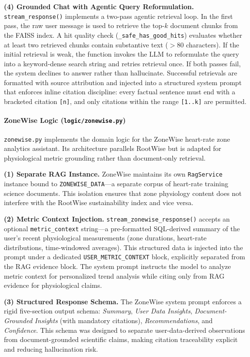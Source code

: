 \documentclass[11pt,twocolumn]{article}
\begin{document}
\textbf{(4) Grounded Chat with Agentic Query Reformulation.} \texttt{stream\_response()} implements a two-pass agentic retrieval loop. In the first pass, the raw user message is used to retrieve the top-$k$ document chunks from the FAISS index. A hit quality check (\texttt{\_safe\_has\_good\_hits}) evaluates whether at least two retrieved chunks contain substantive text ($>$80 characters). If the initial retrieval is weak, the function invokes the LLM to reformulate the query into a keyword-dense search string and retries retrieval once. If both passes fail, the system declines to answer rather than hallucinate. Successful retrievals are formatted with source attribution and injected into a structured system prompt that enforces inline citation discipline: every factual sentence must end with a bracketed citation \texttt{[n]}, and only citations within the range \texttt{[1..k]} are permitted.

\paragraph{ZoneWise Logic (\texttt{logic/zonewise.py})}

\texttt{zonewise.py} implements the domain logic for the ZoneWise heart-rate zone analytics assistant. Its architecture parallels RootWise but is adapted for physiological metric grounding rather than document-only retrieval.

\textbf{(1) Separate RAG Instance.} ZoneWise maintains its own \texttt{RagService} instance bound to \texttt{ZONEWISE\_DATA}—a separate corpus of heart-rate training science documents. This isolation ensures that zone physiology content does not interfere with the RootWise sustainability index and vice versa.

\textbf{(2) Metric Context Injection.} \texttt{stream\_zonewise\_response()} accepts an optional \texttt{metric\_context} string—a pre-formatted SQL-derived summary of the user's recent physiological measurements (zone durations, heart-rate distributions, time-windowed averages). This structured data is injected into the prompt under a dedicated \texttt{USER\_METRIC\_CONTEXT} block, explicitly separated from the RAG evidence block. The system prompt instructs the model to analyze metric context for personalized trend analysis while citing only from RAG evidence for physiological claims.

\textbf{(3) Structured Response Schema.} The ZoneWise system prompt enforces a rigid five-section output schema: \emph{Summary}, \emph{User Data Insights}, \emph{Document-Grounded Insights} (with mandatory citations), \emph{Recommendations}, and \emph{Confidence}. This schema was designed to separate user-data-derived observations from document-grounded scientific claims, making citation traceability explicit and reducing hallucination risk.
\end{document}
